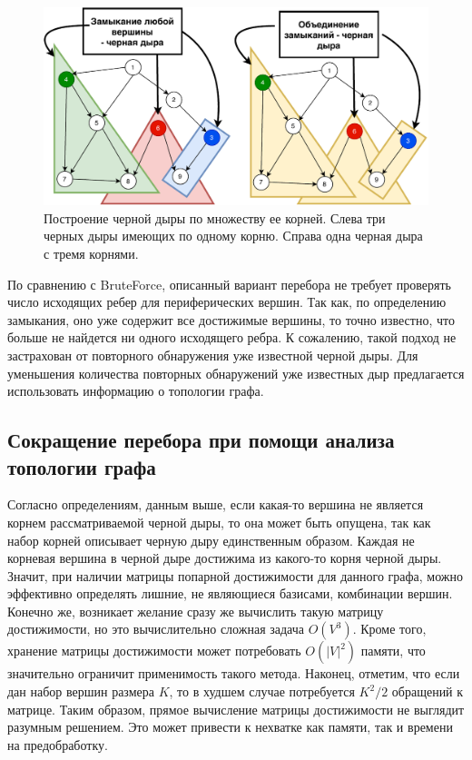 \documentclass[12pt,a4paper,oneside,openany]{article}
\theoremstyle{definition}
\theoremstyle{lemma}
\theoremstyle{remark}
\begin{document}
\begin{figure}[H]
      \centering
      \includegraphics[width=0.8\linewidth]{images/blackhole_roots.pdf}
      \caption{Построение черной дыры по множеству ее корней.
Слева три черных дыры имеющих по одному корню. Справа одна черная дыра с тремя корнями.}
      \label{fig:blackholerootscolored}
\end{figure}

По сравнению с BruteForce, описанный вариант перебора не требует проверять число исходящих ребер для периферических вершин.
Так как, по определению замыкания, оно уже содержит все достижимые вершины, то точно известно, что больше не найдется ни одного
исходящего ребра.
К сожалению, такой подход не застрахован от повторного обнаружения уже известной черной дыры.
Для уменьшения количества повторных обнаружений уже известных дыр предлагается
использовать информацию о топологии графа.

\subsection{Сокращение перебора при помощи анализа топологии графа}

Согласно определениям, данным выше, если какая-то вершина не является корнем рассматриваемой черной дыры,
то она может быть опущена, так как набор корней описывает черную дыру единственным образом.
Каждая не корневая вершина в черной дыре достижима из какого-то корня черной дыры.
Значит, при наличии матрицы попарной достижимости для данного графа,
можно эффективно определять лишние, не являющиеся базисами, комбинации вершин.
Конечно же, возникает желание сразу же вычислить такую матрицу достижимости,
но это вычислительно сложная задача $O(V^3)$.
Кроме того, хранение матрицы достижимости может потребовать $O(|V|^2)$ памяти, что значительно ограничит применимость такого метода.
Наконец, отметим, что если дан набор вершин размера $K$, то в худшем случае потребуется $K^2/2$ обращений к матрице.
Таким образом, прямое вычисление матрицы достижимости не выглядит разумным решением.
Это может привести к нехватке как памяти, так и времени на предобработку.
\end{document}
